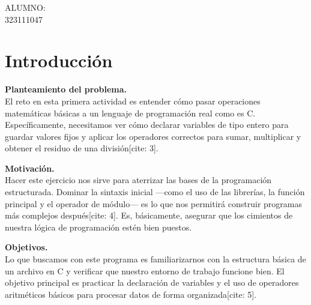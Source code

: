 \vspace{1cm}
ALUMNO:\\
\large 323111047

\section{Introducción}

\textbf{Planteamiento del problema.} \\
El reto en esta primera actividad es entender cómo pasar operaciones matemáticas básicas a un lenguaje de programación real como es C. Específicamente, necesitamos ver cómo declarar variables de tipo entero para guardar valores fijos y aplicar los operadores correctos para sumar, multiplicar y obtener el residuo de una división[cite: 3].

\vspace{0.3cm}

\textbf{Motivación.} \\
Hacer este ejercicio nos sirve para aterrizar las bases de la programación estructurada. Dominar la sintaxis inicial —como el uso de las librerías, la función principal y el operador de módulo— es lo que nos permitirá construir programas más complejos después[cite: 4]. Es, básicamente, asegurar que los cimientos de nuestra lógica de programación estén bien puestos.

\vspace{0.3cm}

\textbf{Objetivos.} \\

Lo que buscamos con este programa es familiarizarnos con la estructura básica de un archivo en C y verificar que nuestro entorno de trabajo funcione bien. El objetivo principal es practicar la declaración de variables y el uso de operadores aritméticos básicos para procesar datos de forma organizada[cite: 5].
